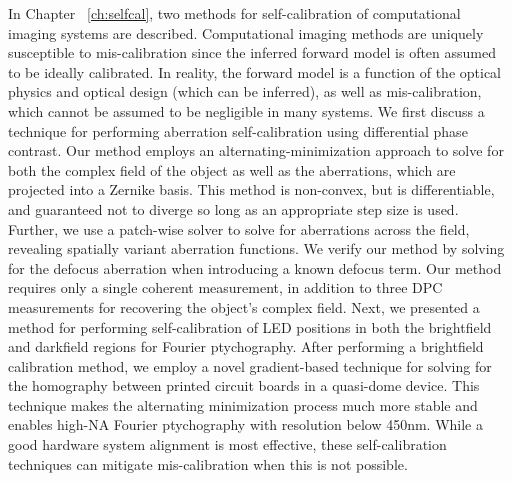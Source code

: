 In Chapter ~\ref{ch:selfcal}, two methods for self-calibration of computational imaging systems are described. Computational imaging methods are uniquely susceptible to mis-calibration since the inferred forward model is often assumed to be ideally calibrated. In reality, the forward model is a function of the optical physics and optical design (which can be inferred), as well as mis-calibration, which cannot be assumed to be negligible in many systems. We first discuss a technique for performing aberration self-calibration using differential phase contrast. Our method employs an alternating-minimization approach to solve for both the complex field of the object as well as the aberrations, which are projected into a Zernike basis. This method is non-convex, but is differentiable, and guaranteed not to diverge so long as an appropriate step size is used. Further, we use a patch-wise solver to solve for aberrations across the field, revealing spatially variant aberration functions. We verify our method by solving for the defocus aberration when introducing a known defocus term. Our method requires only a single coherent measurement, in addition to three DPC measurements for recovering the object's complex field. Next, we presented a method for performing self-calibration of LED positions in both the brightfield and darkfield regions for Fourier ptychography. After performing a brightfield calibration method, we employ a novel gradient-based technique for solving for the homography between printed circuit boards in a quasi-dome device. This technique makes the alternating minimization process much more stable and enables high-NA Fourier ptychography with resolution below 450nm. While a good hardware system alignment is most effective, these self-calibration techniques can mitigate mis-calibration when this is not possible.
\clearpage

